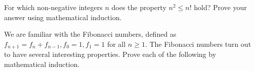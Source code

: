 \documentclass[a4paper]{exam}
\begin{document}
\begin{questions}

\question For which non-negative integers $n$ does the property $n^2 \le n!$ hold? Prove your answer using mathematical induction.
  \begin{solution}
  \end{solution}

\question We are familiar with the Fibonacci numbers, defined as $f_{n+1} = f_n + f_{n-1}, f_0=1, f_1=1$ for all $n \geq 1$. The Fibonacci numbers turn out to have several interesting properties. Prove each of the following by mathematical induction.


\end{questions}
\end{document}

